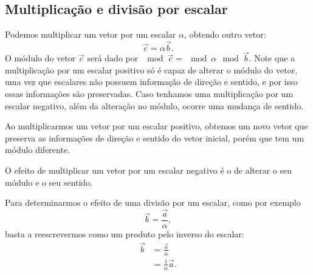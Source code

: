 \subsection{Multiplicação e divisão por escalar}

Podemos multiplicar um vetor por um escalar $\alpha$, obtendo outro vetor:
\begin{equation}
  \vec{c} = \alpha\vec{b}.
\end{equation}
%
O módulo do vetor $\vec{c}$ será dado por $\mod{\vec{c}} = \mod{\alpha}\mod{\vec{b}}$. Note que a multiplicação por um escalar positivo só é capaz de alterar o módulo do vetor, uma vez que escalares não possuem informação de direção e sentido, e por isso essas informações são preservadas. Caso tenhamos uma multiplicação por um escalar negativo, além da alteração no módulo, ocorre uma mudança de sentido.

\begin{marginfigure}
\centering
{}
\caption{Ao multiplicarmos um vetor por um escalar positivo, obtemos um novo vetor que preserva as informações de direção e sentido do vetor inicial, porém que tem um módulo diferente.}
\end{marginfigure}

 \begin{marginfigure}
\centering
{}
\caption{O efeito de multiplicar um vetor por um escalar negativo é o de alterar o seu módulo e o seu sentido.}
\end{marginfigure}

Para determinarmos o efeito de uma divisão por um escalar, como por exemplo
\begin{equation}
    \vec{b} = \frac{\vec{a}}{\alpha},
\end{equation}
%
basta a reescrevermos como um produto pelo inverso do escalar:
\begin{align}
    \vec{b} &= \frac{\vec{a}}{\alpha} \\
    &= \frac{1}{\alpha} \vec{a}.
\end{align}

